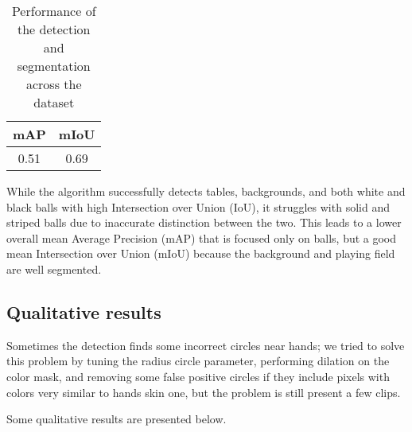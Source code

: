 \begin{table}[H]
	\centering
	\begin{tabular}{|c|c|}
		\hline
		\textbf{mAP} & \textbf{mIoU} \\
		\hline
		0.51 & 0.69 \\
		\hline
	\end{tabular}
	\caption{Performance of the detection and segmentation across the dataset}
	\label{tab: performance across dataset}
\end{table}

While the algorithm successfully detects tables, backgrounds, and both white and black balls with high Intersection over Union (IoU), it struggles with solid and striped balls due to inaccurate distinction between the two.
This leads to a lower overall mean Average Precision (mAP) that is focused only on balls, but a good mean Intersection over Union (mIoU) because the background and playing field are well segmented.

\subsection{Qualitative results}
Sometimes the detection finds some incorrect circles near hands; we tried to solve this problem by tuning the radius circle parameter, performing dilation on the color mask, and removing some false positive circles if they include pixels with colors very similar to hands skin one, but the problem is still present a few clips.

Some qualitative results are presented below.

